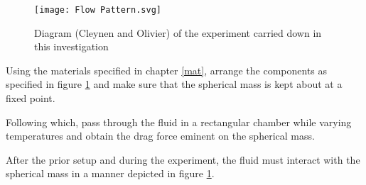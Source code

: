 \begin{figure}[H]
    \centering
    \texttt{[image: Flow Pattern.svg]}
	\caption{{Diagram (Cleynen and Olivier) of the experiment carried down in this investigation}}
    \label{exp1}
\end{figure}


{Using the materials specified in chapter \ref{mat}, arrange the components as specified in figure \ref{exp1} and make sure that the spherical mass is kept about at a fixed point.}

{Following which, pass through the fluid in a rectangular chamber while varying temperatures and obtain the drag force eminent on the spherical mass.}

{After the prior setup and during the experiment, the fluid must interact with the spherical mass in a manner depicted in figure \ref{exp1}.}

